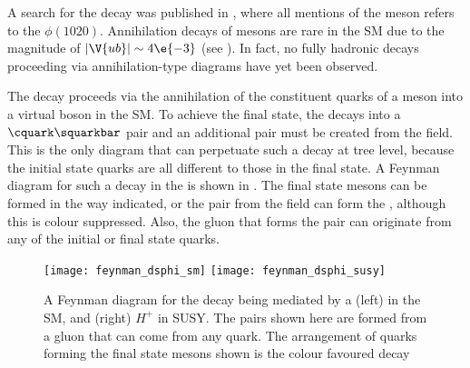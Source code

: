 A search for the decay \btodsphi was published in , where all mentions of
the \phii meson refers to the $\phi(1020)$.
Annihilation decays of \Bp mesons are rare in the SM due to the magnitude of
$|\V{ub}|\sim4\e{-3}$ (see ).
In fact, no fully hadronic decays proceeding via annihilation-type diagrams have yet been
observed.

The decay \btodsphi proceeds via the annihilation of the constituent quarks of a \Bp meson
into a virtual \Wp boson in the SM.
To achieve the final state, the \Wp decays into a $\cquark\squarkbar$ pair and an additional
\ssbar pair must be created from the \QCD field.
This is the only diagram that can perpetuate such a decay at tree level, because the initial state
quarks are all different to those in the final state.
A Feynman diagram for such a decay in the \sm
is shown in .
The final state mesons can be formed in the way indicated, or the \ssbar pair from the \QCD field
can form the \phii, although this is colour suppressed.
Also, the gluon that forms the \ssbar pair can originate from any of the initial or final state
quarks.

\begin{figure}
  \begin{center}
    \texttt{[image: feynman\_dsphi\_sm]}
    \texttt{[image: feynman\_dsphi\_susy]}
    \caption[Feynman diagram for the decay \btodsphi]
    {\small
      A Feynman diagram for the decay \btodsphi being mediated by a
      (left) \Wp in the SM, and
      (right) $H^+$ in SUSY.
      The \ssbar pairs shown here are formed from a gluon that can come from any quark.
      The arrangement of quarks forming the final state mesons shown is the colour favoured decay
    }
    \label{fig:dsphi:feyn}
  \end{center}
\end{figure}



